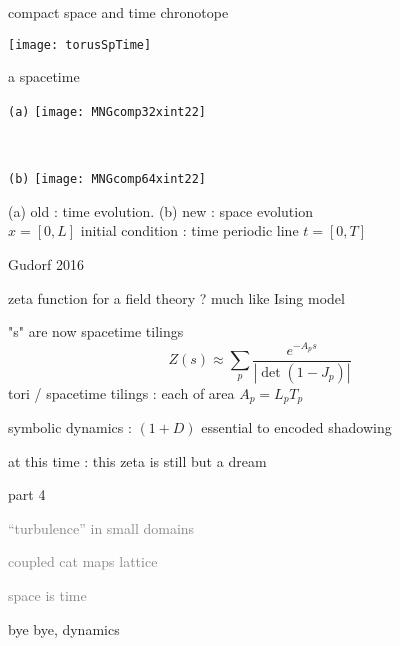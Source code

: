 \begin{frame}{compact space and time chronotope}
\begin{center}
\texttt{[image: torusSpTime]}
\end{center}
\end{frame}

\begin{frame}{a spacetime \twot}
\begin{center}
  \begin{minipage}[height=.40\textheight]{.35\textwidth}
    \centering \small{\texttt{(a)}}
    \texttt{[image: MNGcomp32xint22]}
  \end{minipage}
~~~~~~~~~
  \begin{minipage}[height=.40\textheight]{.35\textwidth}
    \centering \small{\texttt{(b)}}
    \texttt{[image: MNGcomp64xint22]}
  \end{minipage}
\end{center}
    (a) old : time evolution. (b) new : space evolution
    \\
    $x=[0,L]$ %
       initial condition : time periodic line $t = [0,T]$

\vfill\hfill        Gudorf 2016
\end{frame}




\begin{frame}{zeta function for a field theory ? much like Ising model}
\begin{block}{"\po s" are now spacetime tilings}
\[
Z(s) \approx
\sum_{p} \frac{e^{-A_p s}}
              {\left|\det(1-J_p)\right|}
\]
tori / spacetime tilings :
each of area $A_p = L_p T_p$
\end{block}
\begin{block}{symbolic dynamics : $(1+D)$\dmn}
essential to encoded shadowing
\end{block}

\vfill
at this time : this zeta is still but a dream
\end{frame}

\begin{frame}{part 4}
\begin{enumerate}
              \item
    \textcolor{gray}{\small
``turbulence'' in small domains
              \item
coupled cat maps lattice
              \item
space is time
    }
              \item
    {\Large
bye bye, dynamics
    }
            \end{enumerate}
\end{frame}

